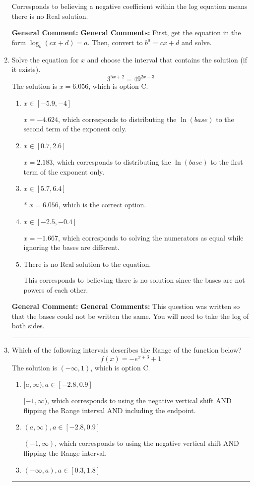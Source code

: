 \documentclass{extbook}[14pt]
\newcommand{\litem}[1]{\item #1

\rule{\textwidth}{0.4pt}}
\begin{document}
\begin{enumerate}
{\begin{enumerate}[label=\Alph*.]
Corresponds to believing a negative coefficient within the log equation means there is no Real solution.
\end{enumerate}

\textbf{General Comment:} \textbf{General Comments:} First, get the equation in the form $\log_b{(cx+d)} = a$. Then, convert to $b^a = cx+d$ and solve.
}
\litem{
Solve the equation for $x$ and choose the interval that contains the solution (if it exists).
\[ 3^{5x+2} = 49^{2x-3} \]
The solution is \( x = 6.056 \), which is option C.\begin{enumerate}[label=\Alph*.]
\item \( x \in [-5.9, -4] \)

$x = -4.624$, which corresponds to distributing the $\ln(base)$ to the second term of the exponent only.
\item \( x \in [0.7, 2.6] \)

$x = 2.183$, which corresponds to distributing the $\ln(base)$ to the first term of the exponent only.
\item \( x \in [5.7, 6.4] \)

* $x = 6.056$, which is the correct option.
\item \( x \in [-2.5, -0.4] \)

$x = -1.667$, which corresponds to solving the numerators as equal while ignoring the bases are different.
\item \( \text{There is no Real solution to the equation.} \)

This corresponds to believing there is no solution since the bases are not powers of each other.
\end{enumerate}

\textbf{General Comment:} \textbf{General Comments:} This question was written so that the bases could not be written the same. You will need to take the log of both sides.
}
\litem{
Which of the following intervals describes the Range of the function below?
\[ f(x) = -e^{x+3}+1 \]
The solution is \( (-\infty, 1) \), which is option C.\begin{enumerate}[label=\Alph*.]
\item \( [a, \infty), a \in [-2.8, 0.9] \)

$[-1, \infty)$, which corresponds to using the negative vertical shift AND flipping the Range interval AND including the endpoint.
\item \( (a, \infty), a \in [-2.8, 0.9] \)

$(-1, \infty)$, which corresponds to using the negative vertical shift AND flipping the Range interval.
\item \( (-\infty, a), a \in [0.3, 1.8] \)


\end{enumerate}}
\end{enumerate}
\end{document}
